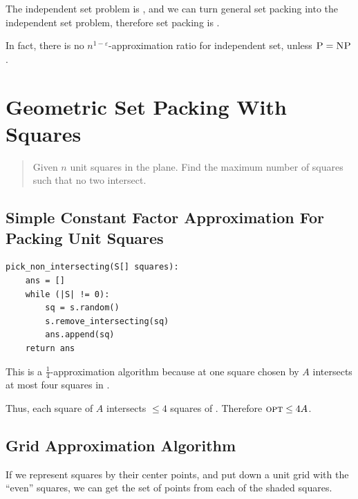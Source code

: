                 The independent set problem is \npcomplete, and we can turn general set packing into the independent set problem, therefore set packing is \npcomplete.

                In fact, there is no $n^{1-\varepsilon}$-approximation ratio for independent set, unless $\textsc{P} = \textsc{NP}$.
            \section{Geometric Set Packing With Squares} %
            \label{sec:geometric_set_packing_with_squares}
                \begin{quotation}
                    Given $n$ unit squares in the plane. Find the maximum number of squares such that no two intersect.
                \end{quotation}
                \subsection{Simple Constant Factor Approximation For Packing Unit Squares} %
                \label{sub:simple_constant_factor_approximation_for_packing_unit_squares}
                    \begin{lstlisting}
pick_non_intersecting(S[] squares):
    ans = []
    while (|S| != 0):
        sq = s.random()
        s.remove_intersecting(sq)
        ans.append(sq)
    return ans
                    \end{lstlisting}
                    This is a $\frac{1}{4}$-approximation algorithm because at one square chosen by $A$ intersects at most four squares in \opt.

                    Thus, each square of $A$ intersects $\le 4$ squares of \opt.
                    Therefore $\textsc{opt} \le 4 A$.
                \subsection{Grid Approximation Algorithm} %
                \label{sub:grid_approximation_algorithm}
                    If we represent squares by their center points, and put down a unit grid with the ``even'' squares, we can get the set of points from each of the shaded squares.


